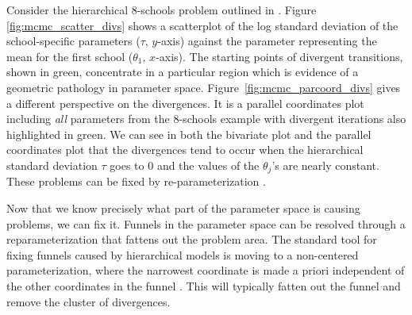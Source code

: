 \documentclass{statsoc}
\begin{document}
Consider the hierarchical 8-schools
problem outlined in \citep{rubin1981, gelman2013bda}. Figure \ref{fig:mcmc_scatter_divs}
shows a scatterplot of the log standard deviation of the school-specific
parameters ($\tau$, $y$-axis) against the parameter representing the mean for
the first school ($\theta_1$, $x$-axis). The starting points of divergent
transitions, shown in green, concentrate in a particular region which is
evidence of a geometric pathology in parameter space. Figure~\ref{fig:mcmc_parcoord_divs}
gives a different perspective on the divergences. It is a parallel coordinates
plot including \emph{all} parameters from the 8-schools example with divergent
iterations also highlighted in green. We can see in both the bivariate plot and
the parallel coordinates plot that the divergences tend to occur when the
hierarchical standard deviation $\tau$ goes to 0 and the values of the
$\theta_j$'s are nearly constant. These problems can be fixed by
re-parameterization \citep{betancourt2015}.

Now that we know precisely what part of the parameter space is causing problems,
we can fix it. Funnels in the parameter space can be resolved through a
reparameterization that fattens out the problem area. The standard tool for
fixing funnels caused by hierarchical models is moving to a non-centered
parameterization, where the narrowest coordinate is made a priori independent of
the other coordinates in the funnel \citep{betancourt2015}. This will typically
fatten out the funnel and remove the cluster of divergences.
\end{document}
